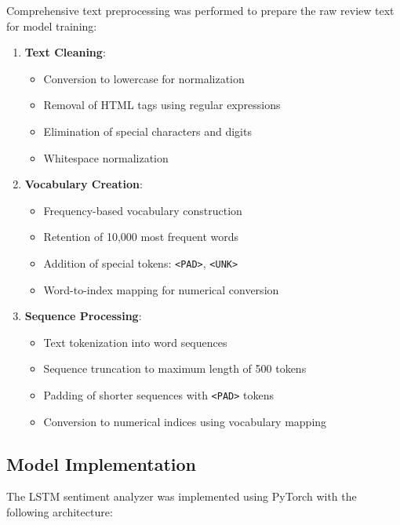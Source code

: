 \documentclass[a4paper, journal]{IEEEtran}
\begin{document}
Comprehensive text preprocessing was performed to prepare the raw review text for model training:

\begin{enumerate}
    \item \textbf{Text Cleaning}: 
    \begin{itemize}
        \item Conversion to lowercase for normalization
        \item Removal of HTML tags using regular expressions
        \item Elimination of special characters and digits
        \item Whitespace normalization
    \end{itemize}
    
    \item \textbf{Vocabulary Creation}:
    \begin{itemize}
        \item Frequency-based vocabulary construction
        \item Retention of 10,000 most frequent words
        \item Addition of special tokens: \texttt{<PAD>}, \texttt{<UNK>}
        \item Word-to-index mapping for numerical conversion
    \end{itemize}
    
    \item \textbf{Sequence Processing}:
    \begin{itemize}
        \item Text tokenization into word sequences
        \item Sequence truncation to maximum length of 500 tokens
        \item Padding of shorter sequences with \texttt{<PAD>} tokens
        \item Conversion to numerical indices using vocabulary mapping
    \end{itemize}
\end{enumerate}

\subsection{Model Implementation}

The LSTM sentiment analyzer was implemented using PyTorch with the following architecture:
\end{document}

